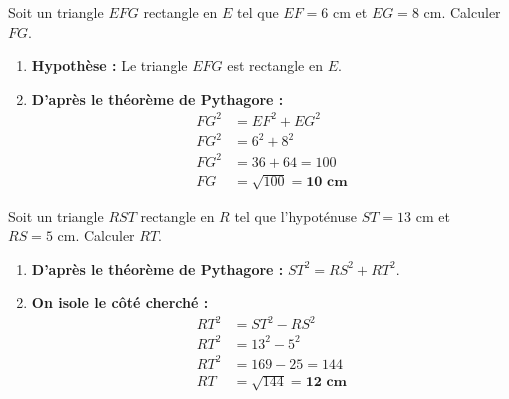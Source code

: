 \begin{center}
\end{center}

\begin{cadremethode}
Soit un triangle $EFG$ rectangle en $E$ tel que $EF = 6\text{ cm}$ et $EG = 8\text{ cm}$. Calculer $FG$.
\begin{enumerate}
    \item \textbf{Hypothèse :} Le triangle $EFG$ est rectangle en $E$.
    \item \textbf{D'après le théorème de Pythagore :}
    \begin{align*}
    FG^2 &= EF^2 + EG^2 \\
    FG^2 &= 6^2 + 8^2 \\
    FG^2 &= 36 + 64 = 100 \\
    FG &= \sqrt{100} = \mathbf{10\text{ cm}}
    \end{align*}
\end{enumerate}
\end{cadremethode}

\begin{cadremethode}
Soit un triangle $RST$ rectangle en $R$ tel que l'hypoténuse $ST = 13\text{ cm}$ et $RS = 5\text{ cm}$. Calculer $RT$.
\begin{enumerate}
    \item \textbf{D'après le théorème de Pythagore :} $ST^2 = RS^2 + RT^2$.
    \item \textbf{On isole le côté cherché :}
    \begin{align*}
    RT^2 &= ST^2 - RS^2 \\
    RT^2 &= 13^2 - 5^2 \\
    RT^2 &= 169 - 25 = 144 \\
    RT &= \sqrt{144} = \mathbf{12\text{ cm}}
    \end{align*}
\end{enumerate}
\end{cadremethode}

